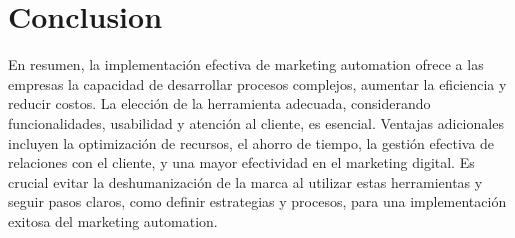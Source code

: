\documentclass[
    a4paper, %
    10pt, %
    unnumberedsections, %
    twoside, %
]{LTJournalArticle}
\begin{document}

\section{Conclusion}

En resumen, la implementación efectiva de marketing automation ofrece a las empresas la capacidad de desarrollar procesos complejos, aumentar la eficiencia y reducir costos. La elección de la herramienta adecuada, considerando funcionalidades, usabilidad y atención al cliente, es esencial. Ventajas adicionales incluyen la optimización de recursos, el ahorro de tiempo, la gestión efectiva de relaciones con el cliente, y una mayor efectividad en el marketing digital. Es crucial evitar la deshumanización de la marca al utilizar estas herramientas y seguir pasos claros, como definir estrategias y procesos, para una implementación exitosa del marketing automation.


\printbibliography %

\end{document}
